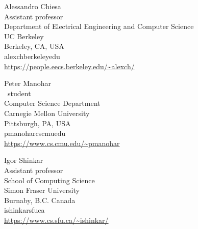 \documentclass{toc}
\theoremstyle{plain}
\begin{document}
%
%
%
%
%
\begin{tocauthors}
\begin{tocinfo}[chiesa]
  Alessandro Chiesa\\
  Assistant professor\\
  Department of Electrical Engineering and Computer Science\\
  UC Berkeley\\
  Berkeley, CA, USA\\
  alexch\tocat{}berkeley\tocdot{}edu \\   %
  \url{https://people.eecs.berkeley.edu/~alexch/}      %
\end{tocinfo}
\begin{tocinfo}[manohar]
  Peter Manohar\\
  \phd\ student \\
  Computer Science Department\\
  Carnegie Mellon University\\
  Pittsburgh, PA, USA\\
  pmanohar\tocat{}cs\tocdot{}cmu\tocdot{}edu\\
  \url{https://www.cs.cmu.edu/~pmanohar}
\end{tocinfo}
\begin{tocinfo}[shinkar]
  Igor Shinkar\\
  Assistant professor\\
  School of Computing Science\\
  Simon Fraser University\\
  Burnaby, B.C. Canada\\
  ishinkar\tocat{}sfu\tocdot{}ca \\   %
  \url{https://www.cs.sfu.ca/~ishinkar/}
\end{tocinfo}
\end{tocauthors}
\end{document}
